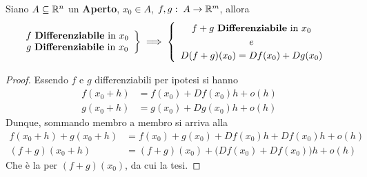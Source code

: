 \begin{proposition}
	\label{prop:diff_somma_funz}
	Siano $A \subseteq \mathbb{R}^n$ un \textbf{Aperto}, $x_0 \in A$, $f, g:\; A \to \mathbb{R}^m$, allora
	\[
		\left.
		\begin{array}{c}
			f \text{ \textbf{Differenziabile} in } x_0\\
			g \text{ \textbf{Differenziabile} in } x_0
		\end{array}
		\right\}
		\implies
		\begin{cases}
			\begin{array}{c}
				f + g \text{ \textbf{Differenziabile} in } x_0\\
				e\\
				D(f + g)(x_0) = Df(x_0) + Dg(x_0)
			\end{array}
		\end{cases}
	\]
	\begin{proof}
		Essendo $f$ e $g$ differenziabili per ipotesi si hanno
		\begin{align*}
			f(x_0 + h) &= f(x_0) + Df(x_0)h + o(h)\\
			g(x_0 + h) &= g(x_0) + Dg(x_0)h + o(h)
		\end{align*}
		Dunque, sommando membro a membro si arriva alla
		\begin{align*}
			f(x_0 + h) + g(x_0 + h) &= f(x_0) + g(x_0) + Df(x_0)h + Df(x_0)h + o(h)\\
			(f + g)(x_0 + h) &= (f + g)(x_0) + \bigl( Df(x_0) + Df(x_0) \bigr) h + o(h)
		\end{align*}
		Che è la  per $(f + g)(x_0)$, da cui la tesi.
	\end{proof}
\end{proposition}
